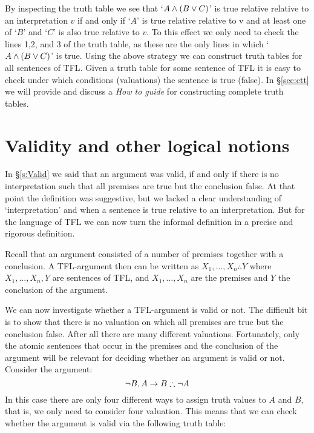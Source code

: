By inspecting the truth table we see that `$A\mathbin{\wedge}(B\vee C)$' is true relative relative to an interpretation $v$ if and only if `$A$' is true relative relative to v and at least one of `$B$' and `$C$' is also true relative to $v$. To this effect we only need to check the lines 1,2, and 3 of the truth table, as these are the only lines in which `$A\mathbin{\wedge}(B\vee C)$' is true. Using the above strategy we can construct truth tables for all sentences of TFL. Given a truth table for some sentence of TFL it is easy to check under which conditions (valuations) the sentence is true (false). In \S\ref{sec:ctt} we will provide and discuss a \emph{How to guide} for constructing complete truth tables.

 \section{Validity and other logical notions}\label{sec:valtt}
 In \S\ref{s:Valid} we said that an argument was valid, if and only if there is no interpretation such that all premises are true but the conclusion false. At that point the definition was suggestive, but we lacked a clear understanding of `interpretation' and when a sentence is true relative to an interpretation. But for the language of TFL we can now turn the informal definition in a precise and rigorous definition.

 Recall that an argument consisted of a number of premises together with a conclusion. A TFL-argument then can be written as $X_1,\ldots,X_n\therefore Y$ where $X_1,\ldots,X_n, Y$ are sentences of TFL, and $X_1,\ldots,X_n$ are the premises and $Y$ the conclusion of the argument.


 We can now investigate whether a TFL-argument is valid or not. The difficult bit is to show that there is no valuation on which all premises are true but the conclusion false. After all there are many different valuations. Fortunately, only the atomic sentences that occur in the premises and the conclusion of the argument will be relevant for deciding whether an argument is valid or not. Consider the argument:
 $$\enot B,A\eif B\therefore\enot A$$
 In this case there are only four different ways to assign truth values to $A$ and $B$, that is, we only need to consider four valuation. This means that we can check whether the argument is valid via the following truth table:

